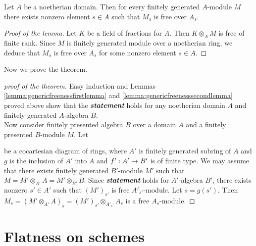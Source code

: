 \begin{lemma}\label{lemma:genericfreenesssecondlemma}
Let $A$ be a noetherian domain. Then for every finitely generated $A$-module $M$ there exists nonzero element $s\in A$ such that $M_s$ is free over $A_s$.
\end{lemma}
\begin{proof}[Proof of the lemma]
Let $K$ be a field of fractions for $A$. Then $K\otimes_AM$ is free of finite rank. Since $M$ is finitely generated module over a noetherian ring, we deduce that $M_s$ is free over $A_s$ for some nonzero element $s\in A$.
\end{proof}
\noindent
Now we prove the theorem.

\begin{proof}[proof of the theorem]
Easy induction and Lemmas \ref{lemma:genericfreenessfirstlemma} and \ref{lemma:genericfreenesssecondlemma} proved above show that the \textit{\textbf{statement}} holds for any noetherian domain $A$ and finitely generated $A$-algebra $B$.\\
Now consider finitely presented algebra $B$ over a domain $A$ and a finitely presented $B$-module $M$. Let
\begin{center}
\end{center}
be a cocartesian diagram of rings, where $A'$ is finitely generated subring of $A$ and $g$ is the inclusion of $A'$ into $A$ and $f':A'\rightarrow B'$ is of finite type. We may assume that there exists finitely generated $B'$-module $M'$ such that $M=M'\otimes_{A'}A=M'\otimes_{B'}B$. Since \textit{\textbf{statement}} holds for $A'$-algebra $B'$, there exists nonzero $s'\in A'$ such that $(M')_{s'}$ is free ${A'}_{s'}$-module. Let $s=g(s')$. Then $M_s=(M'\otimes_{A'}A)_s=(M')_{s'}\otimes_{A'_{s'}}A_s$ is a free $A_s$-module.
\end{proof}

\section{Flatness on schemes}

